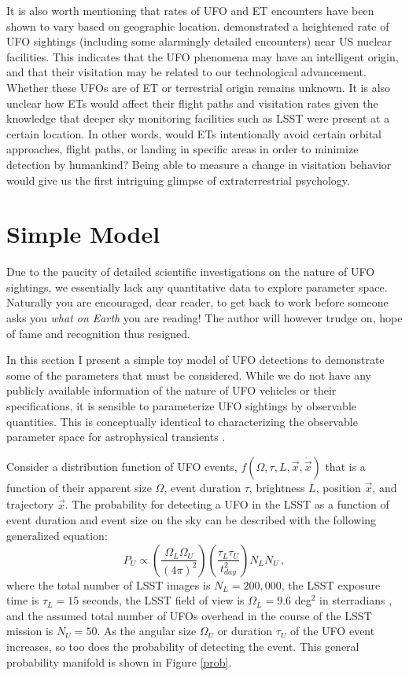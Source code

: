 \documentclass[iop]{emulateapj}
\begin{document}
It is also worth mentioning that rates of UFO and ET encounters have been shown to vary based on geographic location. \citet{johnsonufo} demonstrated a heightened rate of UFO sightings (including some alarmingly detailed encounters) near US nuclear facilities. This indicates that the UFO phenomena may have an intelligent origin, and that their visitation may be related to our technological advancement. Whether these UFOs are of ET or terrestrial origin remains unknown. It is also unclear how ETs would affect their flight paths and visitation rates given the knowledge that deeper sky monitoring facilities such as LSST were present at a certain location. In other words, would ETs intentionally avoid certain orbital approaches, flight paths, or landing in specific areas in order to minimize detection by humankind? Being able to measure a change in visitation behavior would give us the first intriguing glimpse of extraterrestrial psychology.



\section{Simple Model}
Due to the paucity of detailed scientific investigations on the nature of UFO sightings, we essentially lack any quantitative data to explore parameter space. Naturally you are encouraged, dear reader, to get back to work before someone asks you {\it what on Earth} you are reading! The author will however trudge on, hope of fame and recognition thus resigned.


In this section I present a simple toy model of UFO detections to demonstrate some of the parameters that must be considered. While we do not have any publicly available information of the nature of UFO vehicles or their specifications, it is sensible to parameterize UFO sightings by observable quantities. This is conceptually identical to characterizing the observable parameter space for astrophysical transients \citep[e.g.][]{rau2009}. 

Consider a distribution function of UFO events, $f(\Omega,\tau,L,\vec{x},\dot{\vec{x}})$ that is a function of their apparent size $\Omega$, event duration $\tau$, brightness $L$, position $\vec{x}$, and trajectory $\dot{\vec{x}}$. The probability for detecting a UFO in the LSST as a function of event duration and event size on the sky can be described with the following generalized equation:
\begin{equation}
P_U \propto \left(\frac{\Omega_{L} \Omega_{U}}{(4\pi)^2}\right) \left( \frac{\tau_L \tau_U}{t_{day}^2}\right)N_L N_U\,,
\end{equation}
where the total number of LSST images is $N_L = 200,000$, the LSST exposure time is $\tau_L = 15$ seconds, the LSST field of view is $\Omega_L = 9.6$ deg$^2$ in sterradians , and the assumed total number of UFOs overhead in the course of the LSST mission is $N_U = 50$. As the angular size $\Omega_U$ or duration $\tau_U$ of the UFO event increases, so too does the probability of detecting the event. This general probability manifold is shown in Figure \ref{prob}.
\end{document}
